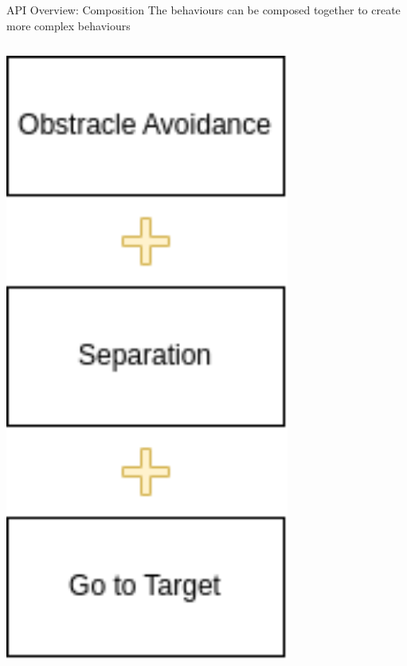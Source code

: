 \documentclass[presentation, 9pt]{beamer}\mode<presentation>{\usetheme{AMSBolognaFC}}
\begin{document}
\begin{frame}[fragile]{API Overview: Composition}
The behaviours can be composed together to create more complex behaviours
\vspace{0.4cm}
\begin{columns}
\begin{column}{0.3\textwidth}
\includegraphics[width=0.7\textwidth]{img/swarm-composition.png}
\end{column}


\end{columns}
\end{frame}
\end{document}
